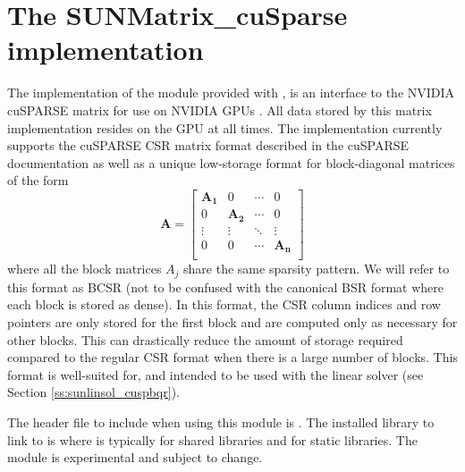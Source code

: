 \section{The SUNMatrix\_cuSparse implementation}\label{ss:sunmat_cusparse}

The  implementation of the  module provided with
{\sundials}, is an interface to the NVIDIA cuSPARSE matrix for use on NVIDIA GPUs
\cite{cuSPARSE_site}. All data stored by this matrix implementation resides on the
GPU at all times. The implementation currently supports the cuSPARSE CSR matrix
format described in the cuSPARSE documentation as well as a unique low-storage
format for block-diagonal matrices of the form
\begin{equation*}
  \mathbf{A} =
  \begin{bmatrix}
    \mathbf{A_1} & 0 & \cdots & 0\\
    0 & \mathbf{A_2} & \cdots & 0\\
    \vdots & \vdots & \ddots & \vdots\\
    0 & 0 & \cdots & \mathbf{A_n}\\
  \end{bmatrix}
\end{equation*}
where all the block matrices $A_j$ share the same sparsity pattern.
We will refer to this format as BCSR (not to be confused with the canonical BSR format where
each block is stored as dense). In this format, the CSR column indices and row pointers
are only stored for the first block and are computed only as necessary for other blocks.
This can drastically reduce the amount of storage required compared to the regular CSR
format when there is a large number of blocks. This format is well-suited for, and
intended to be used with the  linear
solver (see Section \ref{ss:sunlinsol_cuspbqr}).

The header file to include when using this module is
. The installed library to link to is
 where  is typically 
for shared libraries and  for static libraries.
\newline
\newline
{\warn}The  module is experimental and subject to change.

